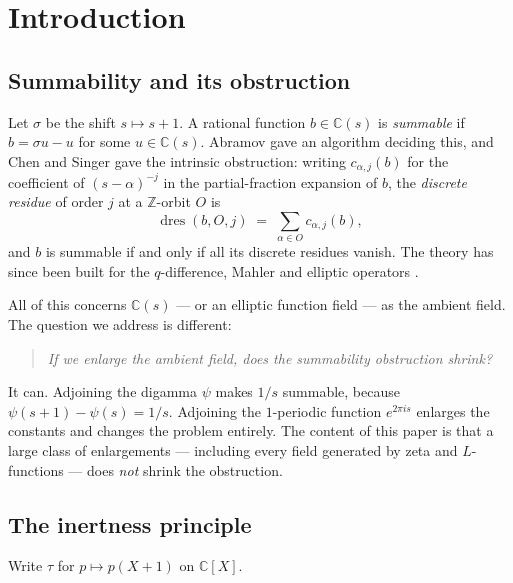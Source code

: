 \documentclass[11pt,a4paper]{amsart}
\theoremstyle{plain}
\theoremstyle{definition}
\newcommand{\CC}{\mathbb{C}}
\newcommand{\ZZ}{\mathbb{Z}}
\newcommand{\sig}{\sigma}
\newcommand{\dres}{\operatorname{dres}}
\begin{document}
\maketitle

\section{Introduction}

\subsection{Summability and its obstruction}
Let $\sig$ be the shift $s\mapsto s+1$. A rational function $b\in\CC(s)$ is \emph{summable} if
$b=\sig u-u$ for some $u\in\CC(s)$. Abramov \cite{Abramov1971} gave an algorithm deciding this, and
Chen and Singer \cite{ChenSinger2012} gave the intrinsic obstruction: writing $c_{\alpha,j}(b)$ for
the coefficient of $(s-\alpha)^{-j}$ in the partial-fraction expansion of $b$, the \emph{discrete
residue} of order $j$ at a $\ZZ$-orbit $O$ is
\[
  \dres(b,O,j)\;=\;\sum_{\alpha\in O}c_{\alpha,j}(b),
\]
and $b$ is summable if and only if all its discrete residues vanish. The theory has since been built
for the $q$-difference, Mahler and elliptic operators
\cite{ChenSinger2012,Arreche2022Mahler,ArrecheBabbitt2025,Arreche2025}.

All of this concerns $\CC(s)$ --- or an elliptic function field --- as the ambient field. The
question we address is different:

\begin{quote}
\emph{If we enlarge the ambient field, does the summability obstruction shrink?}
\end{quote}

It can. Adjoining the digamma $\psi$ makes $1/s$ summable, because $\psi(s+1)-\psi(s)=1/s$. Adjoining
the $1$-periodic function $e^{2\pi is}$ enlarges the constants and changes the problem entirely. The
content of this paper is that a large class of enlargements --- including every field generated by
zeta and $L$-functions --- does \emph{not} shrink the obstruction.

\subsection{The inertness principle}
Write $\tau$ for $p\mapsto p(X+1)$ on $\CC[X]$.
\end{document}
